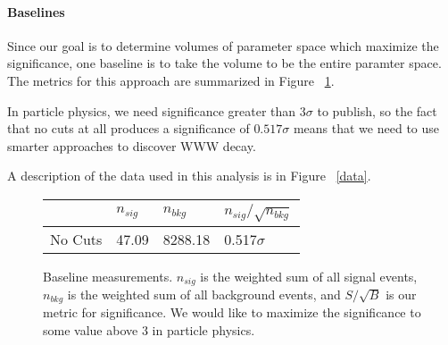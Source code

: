 \documentclass[11pt]{article}
\begin{document}
\paragraph{Baselines}
Since our goal is to determine volumes of parameter space which maximize the significance, one baseline is to take the volume to be the entire paramter space. The metrics for this approach are summarized in Figure ~\ref{baselines}.

In particle physics, we need significance greater than $3\sigma$ to publish, so the fact that no cuts at all produces a significance of $0.517\sigma$ means that we need to use smarter approaches to discover WWW decay.

A description of the data used in this analysis is in Figure ~\ref{data}.

\renewcommand{\figurename}{Fig.}
\begin{figure}
\begin{center}
\begin{tabular}{|l|l|l|l|}

  \cline{2-4}
  \multicolumn{1}{c|}{} & $n_{sig}$ & $n_{bkg}$ & $n_{sig}/\sqrt{n_{bkg}}$ \\
  \hline
  No Cuts & 47.09 & 8288.18 & 0.517$\sigma$ \\
  \hline
\end{tabular}
\caption{Baseline measurements. $n_{sig}$ is the weighted sum of all signal events, $n_{bkg}$ is the weighted sum of all background events, and $S/\sqrt{B}$ is our metric for significance. We would like to maximize the significance to some value above 3 in particle physics.}
\label{baselines}
\end{center}
\end{figure}
\end{document}
